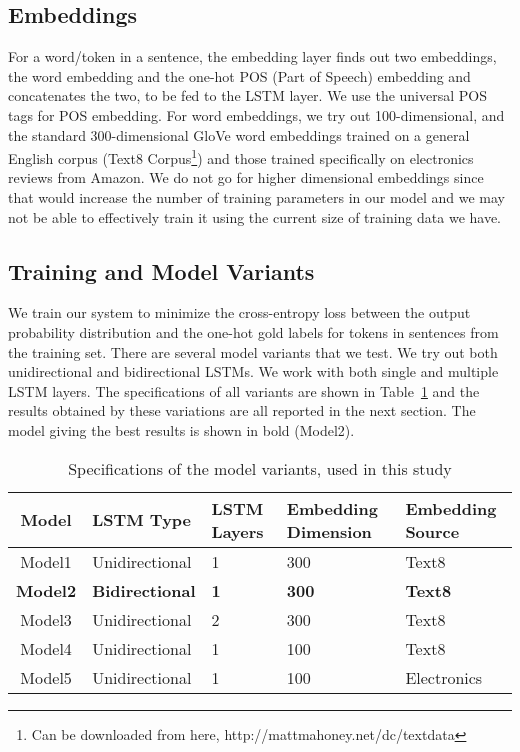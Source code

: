 \subsection{Embeddings}
For a word/token in a sentence, the embedding layer finds out two embeddings, the word embedding and the one-hot POS (Part of Speech) embedding and concatenates the two, to be fed to the LSTM layer. We use the universal POS tags for POS embedding. For word embeddings, we try out 100-dimensional, and the standard 300-dimensional GloVe \cite{pennington2014glove} word embeddings trained on a general English corpus (Text8 Corpus\footnote{Can be downloaded from here, http://mattmahoney.net/dc/textdata}) and those trained specifically on electronics reviews from Amazon. We do not go for higher dimensional embeddings since that would increase the number of training parameters in our model and we may not be able to effectively train it using the current size of training data we have.

\subsection{Training and Model Variants}
We train our system to minimize the cross-entropy loss between the output probability distribution and the one-hot gold labels for tokens in sentences from the training set. There are several model variants that we test. We try out both unidirectional and bidirectional LSTMs. We work with both single and multiple LSTM layers. The specifications of all variants are shown in Table~\ref{modelspecstable} and the results obtained by these variations are all reported in the next section. The model giving the best results is shown in bold (Model2).

\begin{table}[ht]
\centering
\begin{tabular}{ | c || p{18mm} | p{9mm} | p{14.5mm} | p{14.5mm} | }
	\hline			
	Model & LSTM Type & LSTM Layers & Embedding Dimension & Embedding Source \\ \hline
	Model1 & Unidirectional & 1 & 300 & Text8\\ \hline
	\textbf{Model2} & \textbf{Bidirectional} & \textbf{1} & \textbf{300} & \textbf{Text8}\\ \hline
	Model3 & Unidirectional & 2 & 300 & Text8\\ \hline
	Model4 & Unidirectional & 1 & 100 & Text8\\ \hline
    Model5 & Unidirectional & 1 & 100 & Electronics\\ \hline
\end{tabular}
\caption{Specifications of the model variants, used in this study}
\label{modelspecstable}
\vspace{-1.5em}
\end{table}

